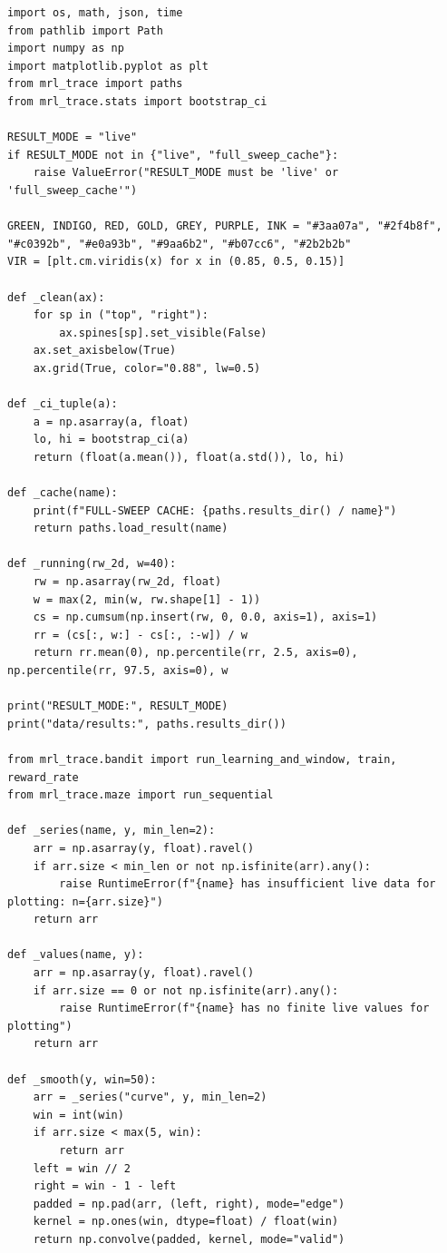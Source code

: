 \begin{lstlisting}[caption={02\_closed\_loop\_rl.ipynb code cell 1},label={lst:mrl-nb-02-closed-loop-rl-1}]
import os, math, json, time
from pathlib import Path
import numpy as np
import matplotlib.pyplot as plt
from mrl_trace import paths
from mrl_trace.stats import bootstrap_ci

RESULT_MODE = "live"
if RESULT_MODE not in {"live", "full_sweep_cache"}:
    raise ValueError("RESULT_MODE must be 'live' or 'full_sweep_cache'")

GREEN, INDIGO, RED, GOLD, GREY, PURPLE, INK = "#3aa07a", "#2f4b8f", "#c0392b", "#e0a93b", "#9aa6b2", "#b07cc6", "#2b2b2b"
VIR = [plt.cm.viridis(x) for x in (0.85, 0.5, 0.15)]

def _clean(ax):
    for sp in ("top", "right"):
        ax.spines[sp].set_visible(False)
    ax.set_axisbelow(True)
    ax.grid(True, color="0.88", lw=0.5)

def _ci_tuple(a):
    a = np.asarray(a, float)
    lo, hi = bootstrap_ci(a)
    return (float(a.mean()), float(a.std()), lo, hi)

def _cache(name):
    print(f"FULL-SWEEP CACHE: {paths.results_dir() / name}")
    return paths.load_result(name)

def _running(rw_2d, w=40):
    rw = np.asarray(rw_2d, float)
    w = max(2, min(w, rw.shape[1] - 1))
    cs = np.cumsum(np.insert(rw, 0, 0.0, axis=1), axis=1)
    rr = (cs[:, w:] - cs[:, :-w]) / w
    return rr.mean(0), np.percentile(rr, 2.5, axis=0), np.percentile(rr, 97.5, axis=0), w

print("RESULT_MODE:", RESULT_MODE)
print("data/results:", paths.results_dir())

from mrl_trace.bandit import run_learning_and_window, train, reward_rate
from mrl_trace.maze import run_sequential

def _series(name, y, min_len=2):
    arr = np.asarray(y, float).ravel()
    if arr.size < min_len or not np.isfinite(arr).any():
        raise RuntimeError(f"{name} has insufficient live data for plotting: n={arr.size}")
    return arr

def _values(name, y):
    arr = np.asarray(y, float).ravel()
    if arr.size == 0 or not np.isfinite(arr).any():
        raise RuntimeError(f"{name} has no finite live values for plotting")
    return arr

def _smooth(y, win=50):
    arr = _series("curve", y, min_len=2)
    win = int(win)
    if arr.size < max(5, win):
        return arr
    left = win // 2
    right = win - 1 - left
    padded = np.pad(arr, (left, right), mode="edge")
    kernel = np.ones(win, dtype=float) / float(win)
    return np.convolve(padded, kernel, mode="valid")
\end{lstlisting}

